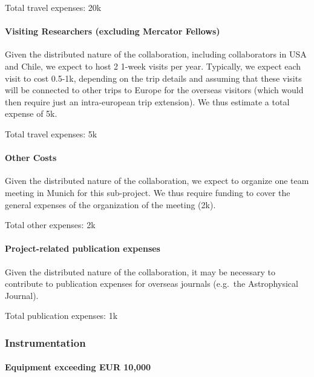 \documentclass[10pt,fleqn,twoside]{article}
\begin{document}
Total travel expenses: 20k\EUR{}


\paragraph{Visiting Researchers (excluding Mercator Fellows)}

Given the distributed nature of the collaboration, including collaborators in USA and Chile, we expect to host 2 1-week visits per year. Typically, we expect each visit to cost 0.5-1k\EUR{}, depending on the trip details and assuming that these visits will be connected to other trips to Europe for the overseas visitors (which would then require just an intra-european trip extension). We thus estimate a total expense of 5k\EUR{}.
\smallskip

Total travel expenses: 5k\EUR{}

\paragraph{Other Costs}

Given the distributed nature of the collaboration, we expect to organize one team meeting in 
Munich for this sub-project. We thus require funding to cover the general expenses of the 
organization of the meeting (2k\EUR{}).\smallskip
 

Total other expenses: 2k\EUR{}

\paragraph{Project-related publication expenses}

Given the distributed nature of the collaboration, it may be necessary to contribute to publication expenses for overseas journals (e.g.\ the Astrophysical Journal). \smallskip

Total publication expenses: 1k\EUR{}

\subsubsection{Instrumentation}

\todo{[Text]}

\paragraph{Equipment exceeding EUR 10,000} 

\todo{[Text]}
\end{document}
